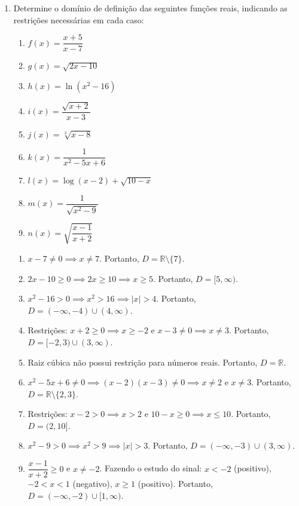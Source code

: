 \documentclass[12pt]{article}
\begin{document}
\begin{enumerate}[label=\arabic*), leftmargin=1.5cm, itemsep=0.5cm]

    \item Determine o domínio de definição das seguintes funções reais, indicando as restrições necessárias em cada caso:
    \begin{enumerate}[label=\alph*)]
        \item $f(x) = \dfrac{x + 5}{x - 7}$
        \item $g(x) = \sqrt{2x - 10}$
        \item $h(x) = \ln(x^2 - 16)$
        \item $i(x) = \dfrac{\sqrt{x + 2}}{x - 3}$
        \item $j(x) = \sqrt[3]{x - 8}$
        \item $k(x) = \dfrac{1}{x^2 - 5x + 6}$
        \item $l(x) = \log(x - 2) + \sqrt{10 - x}$
        \item $m(x) = \dfrac{1}{\sqrt{x^2 - 9}}$
        \item $n(x) = \sqrt{\dfrac{x-1}{x+2}}$
    \end{enumerate}

    \begin{solucao}
        \begin{enumerate}[label=\alph*)]
            \item $x - 7 \neq 0 \implies x \neq 7$. Portanto, $D = \mathbb{R} \setminus \{7\}$.
            \item $2x - 10 \geq 0 \implies 2x \geq 10 \implies x \geq 5$. Portanto, $D = [5, \infty)$.
            \item $x^2 - 16 > 0 \implies x^2 > 16 \implies |x| > 4$. Portanto, $D = (-\infty, -4) \cup (4, \infty)$.
            \item Restrições: $x + 2 \geq 0 \implies x \geq -2$ e $x - 3 \neq 0 \implies x \neq 3$. Portanto, $D = [-2, 3) \cup (3, \infty)$.
            \item Raiz cúbica não possui restrição para números reais. Portanto, $D = \mathbb{R}$.
            \item $x^2 - 5x + 6 \neq 0 \implies (x-2)(x-3) \neq 0 \implies x \neq 2$ e $x \neq 3$. Portanto, $D = \mathbb{R} \setminus \{2, 3\}$.
            \item Restrições: $x - 2 > 0 \implies x > 2$ e $10 - x \geq 0 \implies x \leq 10$. Portanto, $D = (2, 10]$.
            \item $x^2 - 9 > 0 \implies x^2 > 9 \implies |x| > 3$. Portanto, $D = (-\infty, -3) \cup (3, \infty)$.
            \item $\dfrac{x-1}{x+2} \geq 0$ e $x \neq -2$. Fazendo o estudo do sinal: $x < -2$ (positivo), $-2 < x < 1$ (negativo), $x \geq 1$ (positivo). Portanto, $D = (-\infty, -2) \cup [1, \infty)$.
        \end{enumerate}
    \end{solucao}


\end{enumerate}
\end{document}

